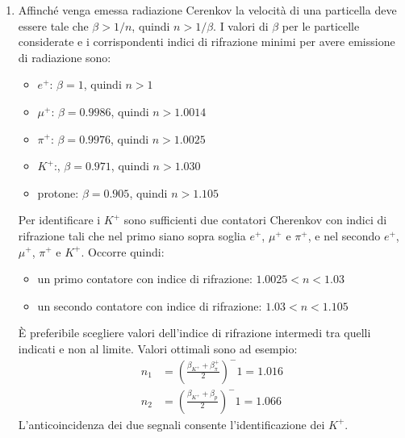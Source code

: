 \begin{Answer}
\begin{enumerate}
  \item Affinch\'e venga emessa radiazione Cerenkov la velocit\`a di una particella deve essere tale che $\beta > 1/n$, quindi $n > 1/\beta$. I valori di $\beta$ per le particelle considerate e i corrispondenti indici di rifrazione minimi per avere emissione di radiazione sono:
    \begin{itemize}
      \item $e^+$: $\beta = 1$, quindi $n >1$
      \item $\mu^+$: $\beta = 0.9986$, quindi $n >1.0014$
      \item $\pi^+$: $\beta = 0.9976$, quindi $n >1.0025$
      \item $K^+$:, $\beta = 0.971$, quindi $n >1.030$
      \item protone: $\beta = 0.905$, quindi $n >1.105$
    \end{itemize}
    Per identificare i $K^+$ sono sufficienti due contatori Cherenkov con indici di rifrazione tali che nel primo siano sopra soglia $e^+$, $\mu^+$ e $\pi^+$, e nel secondo $e^+$, $\mu^+$, $\pi^+$ e
    $K^+$. Occorre quindi:
    \begin{itemize}
    \item un primo contatore con indice di rifrazione: $1.0025 < n <1.03$
    \item un secondo contatore con indice di rifrazione: $1.03 < n <1.105$
    \end{itemize}
    \`E preferibile scegliere valori dell’indice di rifrazione intermedi tra quelli indicati e non al limite. Valori ottimali sono ad esempio:
    \begin{align*}
      n_1 &= \left(\frac{\beta_{K^+} + \beta_\pi^+}{2}\right)^-1 = 1.016 \\
      n_2 &= \left(\frac{\beta_{K^+} + \beta_p}{2}\right)^-1 = 1.066
    \end{align*}
    L’anticoincidenza dei due segnali consente l’identificazione dei $K^+$.
  \end{enumerate}
\end{Answer}
